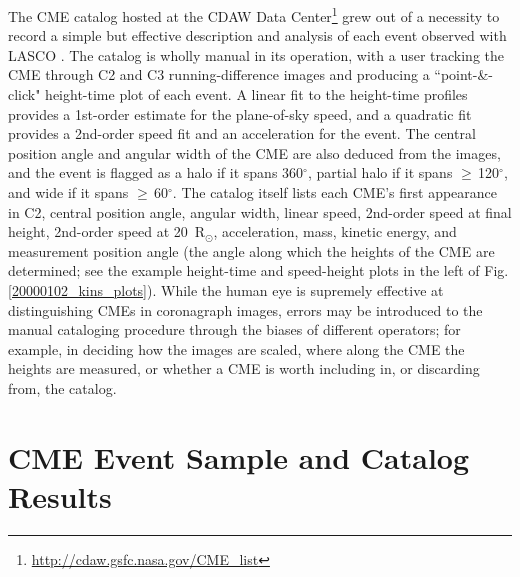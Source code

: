 \documentclass[referee,a4paper,12pt,traditabstract]{swsc}
\begin{document}
The CME catalog hosted at the CDAW Data Center\footnote{\href{http://cdaw.gsfc.nasa.gov/CME_list}{http://cdaw.gsfc.nasa.gov/CME\_list}}  grew out of a necessity to record a simple but effective description and analysis of each event observed with LASCO \citep{2009EM&P..104..295G}. The catalog is wholly manual in its operation, with a user tracking the CME through C2 and C3 running-difference images and producing a ``point-\&-click" height-time plot of each event. A linear fit to the height-time profiles provides a 1st-order estimate for the plane-of-sky speed, and a quadratic fit provides a 2nd-order speed fit and an acceleration for the event. The central position angle and angular width of the CME are also deduced from the images, and the event is flagged as a halo if it spans 360$^{\circ}$, partial halo if it spans $\ge$\,120$^{\circ}$, and wide if it spans $\ge$\,60$^{\circ}$. The catalog itself lists each CME's first appearance in C2, central position angle, angular width, linear speed, 2nd-order speed at final height, 2nd-order speed at 20~R$_{\odot}$, acceleration, mass, kinetic energy, and measurement position angle (the angle along which the heights of the CME are determined; see the example height-time and speed-height plots in the left of Fig.\,\ref{20000102_kins_plots}). While the human eye is supremely effective at distinguishing CMEs in coronagraph images, errors may be introduced to the manual cataloging procedure through the biases of different operators; for example, in deciding how the images are scaled, where along the CME the heights are measured, or whether a CME is worth including in, or discarding from, the catalog.


\section{CME Event Sample and Catalog Results}
\label{sect_events}
\end{document}
